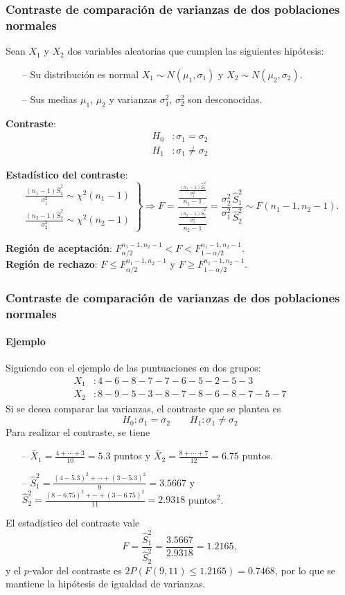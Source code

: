 \begin{frame}
\frametitle{Contraste de comparación de varianzas de dos poblaciones normales}
Sean $X_1$ y $X_2$ dos variables aleatorias que cumplen las siguientes hipótesis:
\begin{itemize}
\item[--] Su distribución es normal $X_1\sim N(\mu_1,\sigma_1)$ y $X_2\sim N(\mu_2,\sigma_2)$.
\item[--] Sus medias $\mu_1$, $\mu_2$ y varianzas $\sigma_1^2$, $\sigma_2^2$ son desconocidas.
\end{itemize}
\textbf{Contraste}:
\begin{align*}
H_0 &: \sigma_1=\sigma_2\\
H_1 &: \sigma_1\neq \sigma_2
\end{align*}

\textbf{Estadístico del contraste}:
\[
\left.
\begin{array}{l}
\displaystyle \frac{(n_1-1)\hat{S}_1^2}{\sigma_1^2}\sim \chi^2(n_1-1) \\
\displaystyle \frac{(n_2-1)\hat{S}_2^2}{\sigma_2^2}\sim \chi^2(n_2-1)
\end{array}
\right\}
\Rightarrow
F= \frac{\frac{\frac{(n_1-1)\hat{S}_1^2}{\sigma_1^2}}{n_1-1}}{\frac{\frac{(n_2-1)\hat{S}_2^2}{\sigma_2^2}}{n_2-1}} =
\frac{\sigma_2^2}{\sigma_1^2}\frac{\hat{S}_1^2}{\hat{S}_2^2}\sim F(n_1-1,n_2-1).
\]

\textbf{Región de aceptación}: $F^{n_1-1,n_2-1}_{\alpha/2}< F < F^{n_1-1,n_2-1}_{1-\alpha/2}$.\\
\textbf{Región de rechazo}: $F\leq F^{n_1-1,n_2-1}_{\alpha/2}$ y $F\geq F^{n_1-1,n_2-1}_{1-\alpha/2}$.
\end{frame}


\begin{frame}
\frametitle{Contraste de comparación de varianzas de dos poblaciones normales}
\framesubtitle{Ejemplo}
Siguiendo con el ejemplo de las puntuaciones en dos grupos:
\begin{align*}
X_1 &: 4 - 6 - 8 - 7 - 7 - 6 - 5 - 2 - 5 - 3 \\
X_2 &: 8 - 9 - 5 - 3 - 8 - 7 - 8 - 6 - 8 - 7 - 5 - 7
\end{align*}
Si se desea comparar las varianzas, el contraste que se plantea es
\[
H_0: \sigma_1=\sigma_2\qquad H_1: \sigma_1\neq \sigma_2
\]
Para realizar el contraste, se tiene
\begin{itemize}
\item[--] $\bar{X}_1 = \frac{4+\cdots +3}{10}=5.3$ puntos y $\bar{X}_2=\frac{8+\cdots +7}{12}=6.75$ puntos.
\item[--] $\hat{S}_1^2= \frac{(4-5.3)^2+\cdots + (3-5.3)^2}{9}=3.5667$ y $\hat{S}_2^2= \frac{(8-6.75)^2+\cdots + (3-6.75)^2}{11}=2.9318$ puntos$^2$.
\end{itemize}
El estadístico del contraste vale
\[
F = \frac{\hat{S}_1^2}{\hat{S}_2^2} = \frac{3.5667}{2.9318}=1.2165,
\]
y el $p$-valor del contraste es $2P(F(9,11)\leq 1.2165)=0.7468$, por lo que se mantiene la hipótesis de igualdad de varianzas.
\end{frame}


